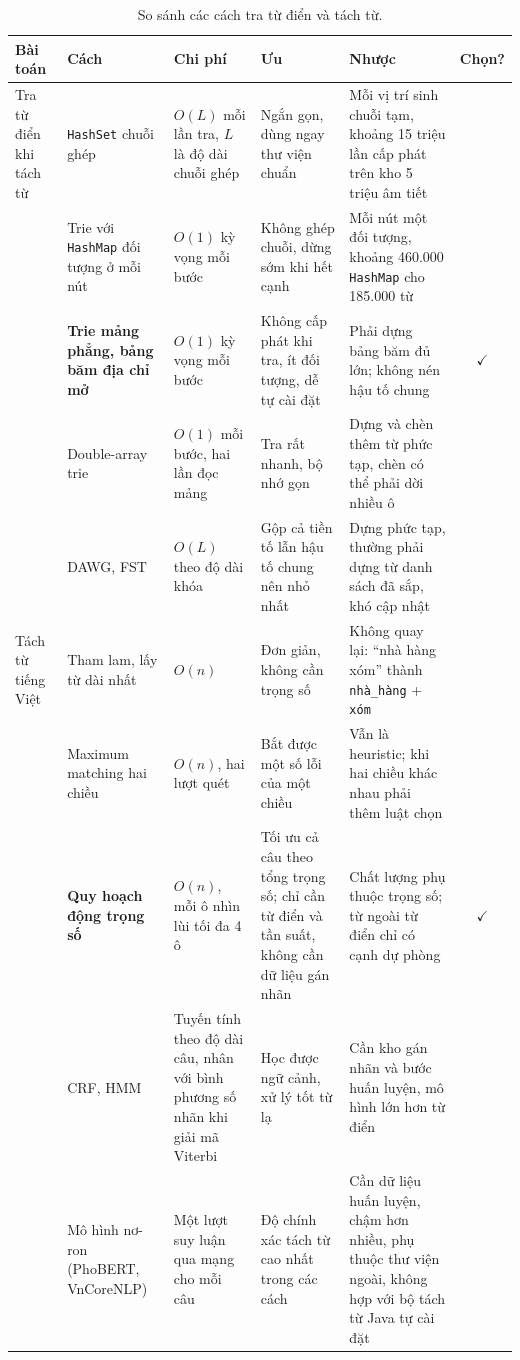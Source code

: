 \documentclass[9pt,twocolumn,a4paper]{extarticle}
\newcommand{\code}[1]{\texttt{#1}}
\begin{document}
\begin{table}[!t]
\centering
\caption{So sánh các cách tra từ điển và tách từ.}
\label{tab:cmp2a}
\footnotesize
\setlength{\tabcolsep}{3pt}
\begin{tabular}{@{}>{\raggedright\arraybackslash}p{1.9cm}>{\raggedright\arraybackslash}p{3.1cm}>{\raggedright\arraybackslash}p{2.6cm}>{\raggedright\arraybackslash}p{3.9cm}>{\raggedright\arraybackslash}p{4.1cm}c@{}}
\toprule
Bài toán & Cách & Chi phí & Ưu & Nhược & Chọn? \\
\midrule
Tra từ điển khi tách từ
& \code{HashSet} chuỗi ghép & $O(L)$ mỗi lần tra, $L$ là độ dài chuỗi ghép & Ngắn gọn, dùng ngay thư viện chuẩn & Mỗi vị trí sinh chuỗi tạm, khoảng 15 triệu lần cấp phát trên kho 5 triệu âm tiết & \\
& Trie với \code{HashMap} đối tượng ở mỗi nút & $O(1)$ kỳ vọng mỗi bước & Không ghép chuỗi, dừng sớm khi hết cạnh & Mỗi nút một đối tượng, khoảng 460.000 \code{HashMap} cho 185.000 từ & \\
& \textbf{Trie mảng phẳng, bảng băm địa chỉ mở} & $O(1)$ kỳ vọng mỗi bước & Không cấp phát khi tra, ít đối tượng, dễ tự cài đặt & Phải dựng bảng băm đủ lớn; không nén hậu tố chung & $\checkmark$ \\
& Double-array trie & $O(1)$ mỗi bước, hai lần đọc mảng & Tra rất nhanh, bộ nhớ gọn & Dựng và chèn thêm từ phức tạp, chèn có thể phải dời nhiều ô & \\
& DAWG, FST & $O(L)$ theo độ dài khóa & Gộp cả tiền tố lẫn hậu tố chung nên nhỏ nhất & Dựng phức tạp, thường phải dựng từ danh sách đã sắp, khó cập nhật & \\
\midrule
Tách từ tiếng Việt
& Tham lam, lấy từ dài nhất & $O(n)$ & Đơn giản, không cần trọng số & Không quay lại: ``nhà hàng xóm'' thành \code{nhà\_hàng} + \code{xóm} & \\
& Maximum matching hai chiều & $O(n)$, hai lượt quét & Bắt được một số lỗi của một chiều & Vẫn là heuristic; khi hai chiều khác nhau phải thêm luật chọn & \\
& \textbf{Quy hoạch động trọng số} & $O(n)$, mỗi ô nhìn lùi tối đa 4 ô & Tối ưu cả câu theo tổng trọng số; chỉ cần từ điển và tần suất, không cần dữ liệu gán nhãn & Chất lượng phụ thuộc trọng số; từ ngoài từ điển chỉ có cạnh dự phòng & $\checkmark$ \\
& CRF, HMM & Tuyến tính theo độ dài câu, nhân với bình phương số nhãn khi giải mã Viterbi & Học được ngữ cảnh, xử lý tốt từ lạ & Cần kho gán nhãn và bước huấn luyện, mô hình lớn hơn từ điển & \\
& Mô hình nơ-ron (PhoBERT, VnCoreNLP) & Một lượt suy luận qua mạng cho mỗi câu & Độ chính xác tách từ cao nhất trong các cách & Cần dữ liệu huấn luyện, chậm hơn nhiều, phụ thuộc thư viện ngoài, không hợp với bộ tách từ Java tự cài đặt & \\
\bottomrule
\end{tabular}
\end{table}
\end{document}
